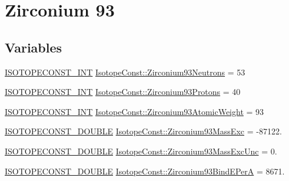 \hypertarget{group___isotope_const-_zirconium-_zr93}{}\section{Zirconium 93}
\label{group___isotope_const-_zirconium-_zr93}
\subsection*{Variables}
\begin{DoxyCompactItemize}
\item 
\mbox{\hyperlink{group___isotope_const-_macros_ga5f18360b3e99483a35c32d789e62621c}{I\+S\+O\+T\+O\+P\+E\+C\+O\+N\+S\+T\+\_\+\+I\+NT}} \mbox{\hyperlink{group___isotope_const-_zirconium-_zr93_ga07bd9b4aba62777f42f17d6608ae6f98}{Isotope\+Const\+::\+Zirconium93\+Neutrons}} = 53
\item 
\mbox{\hyperlink{group___isotope_const-_macros_ga5f18360b3e99483a35c32d789e62621c}{I\+S\+O\+T\+O\+P\+E\+C\+O\+N\+S\+T\+\_\+\+I\+NT}} \mbox{\hyperlink{group___isotope_const-_zirconium-_zr93_ga2cd160acd22d23187997851a770be874}{Isotope\+Const\+::\+Zirconium93\+Protons}} = 40
\item 
\mbox{\hyperlink{group___isotope_const-_macros_ga5f18360b3e99483a35c32d789e62621c}{I\+S\+O\+T\+O\+P\+E\+C\+O\+N\+S\+T\+\_\+\+I\+NT}} \mbox{\hyperlink{group___isotope_const-_zirconium-_zr93_ga35c76584b50e70e7474c81365217e103}{Isotope\+Const\+::\+Zirconium93\+Atomic\+Weight}} = 93
\item 
\mbox{\hyperlink{group___isotope_const-_macros_ga8f45a7272ce02c0b4c65c44636ed719a}{I\+S\+O\+T\+O\+P\+E\+C\+O\+N\+S\+T\+\_\+\+D\+O\+U\+B\+LE}} \mbox{\hyperlink{group___isotope_const-_zirconium-_zr93_ga8f5b4b8ef56f7913f9859489e5ee94df}{Isotope\+Const\+::\+Zirconium93\+Mass\+Exc}} = -\/87122.
\item 
\mbox{\hyperlink{group___isotope_const-_macros_ga8f45a7272ce02c0b4c65c44636ed719a}{I\+S\+O\+T\+O\+P\+E\+C\+O\+N\+S\+T\+\_\+\+D\+O\+U\+B\+LE}} \mbox{\hyperlink{group___isotope_const-_zirconium-_zr93_ga05e602f5ff218ee37e03280238c322de}{Isotope\+Const\+::\+Zirconium93\+Mass\+Exc\+Unc}} = 0.
\item 
\mbox{\hyperlink{group___isotope_const-_macros_ga8f45a7272ce02c0b4c65c44636ed719a}{I\+S\+O\+T\+O\+P\+E\+C\+O\+N\+S\+T\+\_\+\+D\+O\+U\+B\+LE}} \mbox{\hyperlink{group___isotope_const-_zirconium-_zr93_ga6f243e5b7d10951a4b6936daf0d4c2f9}{Isotope\+Const\+::\+Zirconium93\+Bind\+E\+PerA}} = 8671.
\item 

\end{DoxyCompactItemize}

